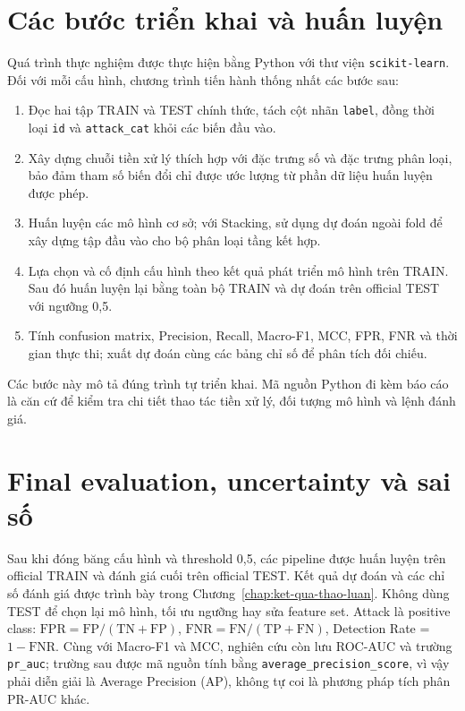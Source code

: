 \section{Các bước triển khai và huấn luyện}
Quá trình thực nghiệm được thực hiện bằng Python với thư viện \texttt{scikit-learn}. Đối với mỗi cấu hình, chương trình tiến hành thống nhất các bước sau:
\begin{enumerate}
\item Đọc hai tập TRAIN và TEST chính thức, tách cột nhãn \texttt{label}, đồng thời loại \texttt{id} và \texttt{attack\_cat} khỏi các biến đầu vào.
\item Xây dựng chuỗi tiền xử lý thích hợp với đặc trưng số và đặc trưng phân loại, bảo đảm tham số biến đổi chỉ được ước lượng từ phần dữ liệu huấn luyện được phép.
\item Huấn luyện các mô hình cơ sở; với Stacking, sử dụng dự đoán ngoài fold để xây dựng tập đầu vào cho bộ phân loại tầng kết hợp.
\item Lựa chọn và cố định cấu hình theo kết quả phát triển mô hình trên TRAIN. Sau đó huấn luyện lại bằng toàn bộ TRAIN và dự đoán trên official TEST với ngưỡng 0,5.
\item Tính confusion matrix, Precision, Recall, Macro-F1, MCC, FPR, FNR và thời gian thực thi; xuất dự đoán cùng các bảng chỉ số để phân tích đối chiếu.
\end{enumerate}
Các bước này mô tả đúng trình tự triển khai. Mã nguồn Python đi kèm báo cáo là căn cứ để kiểm tra chi tiết thao tác tiền xử lý, đối tượng mô hình và lệnh đánh giá.

\section{Final evaluation, uncertainty và sai số}
Sau khi đóng băng cấu hình và threshold 0,5, các pipeline được huấn luyện trên official TRAIN và đánh giá cuối trên official TEST. Kết quả dự đoán và các chỉ số đánh giá được trình bày trong Chương~\ref{chap:ket-qua-thao-luan}. Không dùng TEST để chọn lại mô hình, tối ưu ngưỡng hay sửa feature set. Attack là positive class: $\mathrm{FPR}=\mathrm{FP}/(\mathrm{TN}+\mathrm{FP})$, $\mathrm{FNR}=\mathrm{FN}/(\mathrm{TP}+\mathrm{FN})$, Detection Rate = $1-\mathrm{FNR}$. Cùng với Macro-F1 và MCC, nghiên cứu còn lưu ROC-AUC và trường \texttt{pr\_auc}; trường sau được mã nguồn tính bằng \texttt{average\_precision\_score}, vì vậy phải diễn giải là Average Precision (AP), không tự coi là phương pháp tích phân PR-AUC khác.


